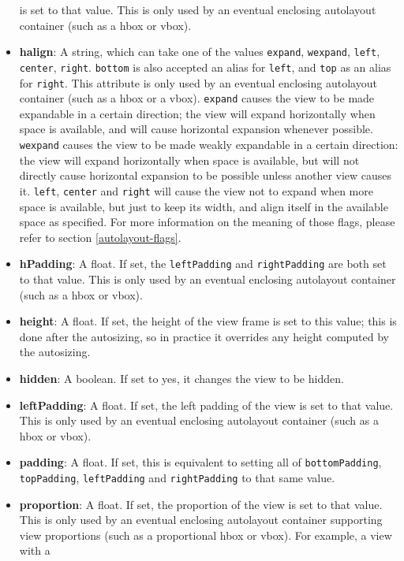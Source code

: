 \begin{itemize}
  is set to that value.  This is only used by an eventual enclosing
  autolayout container (such as a hbox or vbox).
\item {\bf halign}: A string, which can take one of the values
  \texttt{expand}, \texttt{wexpand}, \texttt{left}, \texttt{center},
  \texttt{right}.  \texttt{bottom} is also accepted an alias for
  \texttt{left}, and \texttt{top} as an alias for \texttt{right}.
  This attribute is only used by an eventual enclosing autolayout
  container (such as a hbox or a vbox).  \texttt{expand} causes the
  view to be made expandable in a certain direction; the view will
  expand horizontally when space is available, and will cause
  horizontal expansion whenever possible.  \texttt{wexpand} causes the
  view to be made weakly expandable in a certain direction: the view
  will expand horizontally when space is available, but will not
  directly cause horizontal expansion to be possible unless another
  view causes it.  \texttt{left}, \texttt{center} and \texttt{right}
  will cause the view not to expand when more space is available, but
  just to keep its width, and align itself in the available space as
  specified.  For more information on the meaning of those flags,
  please refer to section \ref{autolayout-flags}.
\item {\bf hPadding}: A float.  If set, the \texttt{leftPadding} and
  \texttt{rightPadding} are both set to that value.  This is only used
  by an eventual enclosing autolayout container (such as a hbox or
  vbox).
\item {\bf height}: A float.  If set, the height of the view frame is
  set to this value; this is done after the autosizing, so in practice
  it overrides any height computed by the autosizing.
\item {\bf hidden}: A boolean.  If set to yes, it changes the view to
  be hidden.
\item {\bf leftPadding}: A float.  If set, the left padding of the
  view is set to that value.  This is only used by an eventual
  enclosing autolayout container (such as a hbox or vbox).
\item {\bf padding}: A float.  If set, this is equivalent to setting
  all of \texttt{bottomPadding}, \texttt{topPadding}, \texttt{leftPadding}
  and \texttt{rightPadding} to that same value.
\item {\bf proportion}: A float.  If set, the proportion of the view
  is set to that value.  This is only used by an eventual enclosing
  autolayout container supporting view proportions (such as a
  proportional hbox or vbox).  For example, a view with a

\end{itemize}
